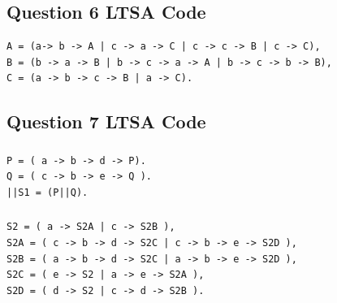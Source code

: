 \documentclass{article}[8pt]
\begin{document}
\subsection{Question 6 LTSA Code}

\begin{lstlisting}
A = (a-> b -> A | c -> a -> C | c -> c -> B | c -> C),
B = (b -> a -> B | b -> c -> a -> A | b -> c -> b -> B),
C = (a -> b -> c -> B | a -> C).
\end{lstlisting}

\subsection{Question 7 LTSA Code}

\subsubsection{}

\begin{lstlisting}
P = ( a -> b -> d -> P).
Q = ( c -> b -> e -> Q ).
||S1 = (P||Q).
\end{lstlisting}

\subsubsection{}

\begin{lstlisting}
S2 = ( a -> S2A | c -> S2B ),
S2A = ( c -> b -> d -> S2C | c -> b -> e -> S2D ),
S2B = ( a -> b -> d -> S2C | a -> b -> e -> S2D ),
S2C = ( e -> S2 | a -> e -> S2A ),
S2D = ( d -> S2 | c -> d -> S2B ).
\end{lstlisting}
\end{document}
